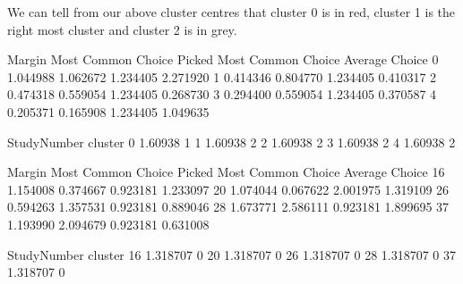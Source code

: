 \documentclass[letterpaper,10pt,english]{jupyterBook}
\begin{document}
\sphinxAtStartPar
We can tell from our above cluster centres that cluster 0 is in red, cluster 1 is the right most cluster and cluster 2 is in grey.

\begin{sphinxVerbatim}[commandchars=\\\{\}]
\PYG{p}{[}\PYG{p}{]}  
\end{sphinxVerbatim}

\begin{sphinxVerbatim}[commandchars=\\\{\}]
     Margin  Most Common Choice Picked  Most Common Choice  Average Choice  \PYGZbs{}
0  1.044988                   1.062672            1.234405        2.271920   
1 \PYGZhy{}0.414346                  \PYGZhy{}0.804770            1.234405       \PYGZhy{}0.410317   
2 \PYGZhy{}0.474318                  \PYGZhy{}0.559054            1.234405        0.268730   
3 \PYGZhy{}0.294400                  \PYGZhy{}0.559054            1.234405        0.370587   
4  0.205371                  \PYGZhy{}0.165908            1.234405        1.049635   

   StudyNumber  cluster  
0     \PYGZhy{}1.60938        1  
1     \PYGZhy{}1.60938        2  
2     \PYGZhy{}1.60938        2  
3     \PYGZhy{}1.60938        2  
4     \PYGZhy{}1.60938        2  
\end{sphinxVerbatim}

\begin{sphinxVerbatim}[commandchars=\\\{\}]
  \PYG{p}{[}\PYG{p}{]}
\end{sphinxVerbatim}

\begin{sphinxVerbatim}[commandchars=\\\{\}]
      Margin  Most Common Choice Picked  Most Common Choice  Average Choice  \PYGZbs{}
16 \PYGZhy{}1.154008                   0.374667           \PYGZhy{}0.923181       \PYGZhy{}1.233097   
20 \PYGZhy{}1.074044                  \PYGZhy{}0.067622           \PYGZhy{}2.001975       \PYGZhy{}1.319109   
26 \PYGZhy{}0.594263                   1.357531           \PYGZhy{}0.923181       \PYGZhy{}0.889046   
28 \PYGZhy{}1.673771                   2.586111           \PYGZhy{}0.923181       \PYGZhy{}1.899695   
37 \PYGZhy{}1.193990                   2.094679           \PYGZhy{}0.923181       \PYGZhy{}0.631008   

    StudyNumber  cluster  
16     1.318707        0  
20     1.318707        0  
26     1.318707        0  
28     1.318707        0  
37     1.318707        0  
\end{sphinxVerbatim}
\end{document}
